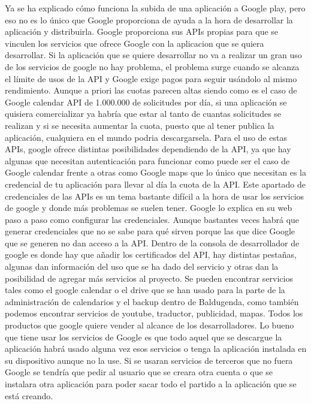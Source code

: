 Ya se ha explicado cómo funciona la subida de una aplicación a Google play, pero eso no es lo único que Google proporciona de ayuda a la hora de desarrollar la aplicación y distribuirla.
Google proporciona sus APIs propias para que se vinculen los servicios que ofrece Google con la aplicacion que se quiera desarrollar. Si la aplicación que se quiere desarrollar no va a realizar un gran uso de los servicios de google no hay problema, el problema surge cuando se alcanza el límite de usos de la API y Google exige pagos para seguir usándolo al mismo rendimiento.
Aunque a priori las cuotas parecen altas siendo como es el caso de Google calendar API de 1.000.000 de solicitudes por día, si una aplicación se quisiera comercializar ya habría que estar al tanto de cuantas solicitudes se realizan y si se necesita aumentar la cuota, puesto que al tener publica la aplicación, cualquiera en el mundo podria descargarsela.
Para el uso de estas APIs, google ofrece distintas posibilidades dependiendo de la API, ya que hay algunas que necesitan autenticación para funcionar como puede ser el caso de Google calendar frente a otras como Google maps que lo único que necesitan es la credencial de tu aplicación para llevar al día la cuota de la API.
Este apartado de credenciales de las APIs es un tema bastante difícil a la hora de usar los servicios de google y donde más problemas se suelen tener. Google lo explica en su web paso a paso como configurar las credenciales. Aunque bastantes veces habrá que generar credenciales que no se sabe para qué sirven porque las que dice Google que se generen no dan acceso a la API.
Dentro de la consola de desarrollador de google es donde hay que añadir los certificados del API, hay distintas pestañas, algunas dan información del uso que se ha dado del servicio y otras dan la posibilidad de agregar más servicios al proyecto.
Se pueden encontrar servicios tales como el google calendar o el drive que se han usado para la parte de la administración de calendarios y el backup dentro de Baldugenda, como también podemos encontrar servicios de youtube, traductor, publicidad, mapas. Todos los productos que google quiere vender al alcance de los desarrolladores.
Lo bueno que tiene usar los servicios de Google es que todo aquel que se descargue la aplicación habrá usado alguna vez esos servicios o tenga la aplicación instalada en su dispositivo aunque no la use. Si se usaran servicios de terceros que no fuera Google se tendría que pedir al usuario que se creara otra cuenta o que se instalara otra aplicación para poder sacar todo el partido a la aplicación que se está creando.

